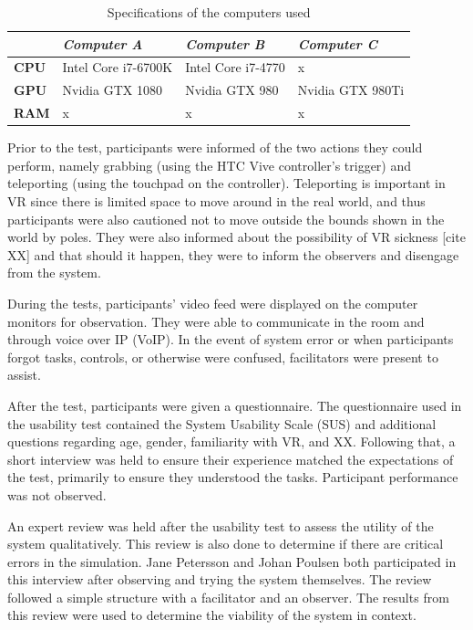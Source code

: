 \documentclass[conference]{IEEEtran}
\begin{document}
\begin{table}[H]
\centering
\begin{tabularx}{0.48\textwidth}{X X X X}
\toprule
                     & \textit{Computer A} & \textit{Computer B} & \textit{Computer C} \\ \midrule \rowcolor{lightGrey}
\textbf{CPU}         & Intel Core i7-6700K & Intel Core i7-4770  & x                   \\

\textbf{GPU}         & Nvidia GTX 1080     & Nvidia GTX 980      & Nvidia GTX 980Ti    \\  \rowcolor{lightGrey}

\textbf{RAM} 		 & x                   & x                   & x                   \\ \toprule
\end{tabularx}
\caption{Specifications of the computers used}
\label{tab:specs}
\end{table}

Prior to the test, participants were informed of the two actions they could perform, namely grabbing (using the HTC Vive controller's trigger) and teleporting (using the touchpad on the controller). Teleporting is important in VR since there is limited space to move around in the real world, and thus participants were also cautioned not to move outside the bounds shown in the world by poles. They were also informed about the possibility of VR sickness [cite XX] and that should it happen, they were to inform the observers and disengage from the system.

During the tests, participants' video feed were displayed on the computer monitors for observation. They were able to communicate in the room and through voice over IP (VoIP). In the event of system error or when participants forgot tasks, controls, or otherwise were confused, facilitators were present to assist. 

After the test, participants were given a questionnaire. The questionnaire used in the usability test contained the System Usability Scale (SUS) and additional questions regarding age, gender, familiarity with VR, and XX. Following that, a short interview was held to ensure their experience matched the expectations of the test, primarily to ensure they understood the tasks. Participant performance was not observed.

An expert review was held after the usability test to assess the utility of the system qualitatively. This review is also done to determine if there are critical errors in the simulation. Jane Petersson and Johan Poulsen both participated in this interview after observing and trying the system themselves. The review followed a simple structure with a facilitator and an observer. The results from this review were used to determine the viability of the system in context.
\end{document}
